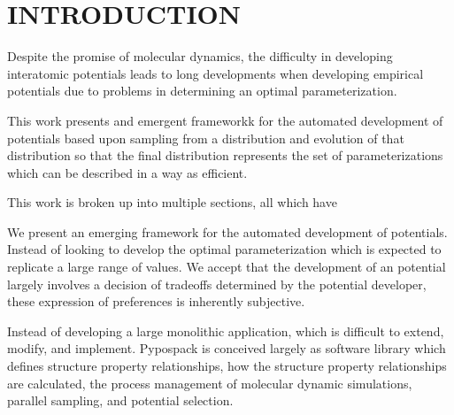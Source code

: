 \chapter{INTRODUCTION}\label{intro}

Despite the promise of molecular dynamics, the difficulty in developing interatomic potentials leads to long developments when developing empirical potentials due to problems in determining an optimal parameterization.

This work presents and emergent frameworkk for the automated development of potentials based upon sampling from a distribution and evolution of that distribution so that the final distribution represents the set of parameterizations which can be described in a way as efficient.

This work is broken up into multiple sections, all which have


We present an emerging framework for the automated development of potentials.
Instead of looking to develop the optimal parameterization which is expected to replicate a large range of values.
We accept that the development of an potential largely involves a decision of tradeoffs determined by the potential developer, these expression of preferences is inherently subjective.

Instead of developing a large monolithic application, which is difficult to extend, modify, and implement.  Pypospack is conceived largely as software library which defines structure property relationships, how the structure property relationships are calculated, the process management of molecular dynamic simulations, parallel sampling, and potential selection.
